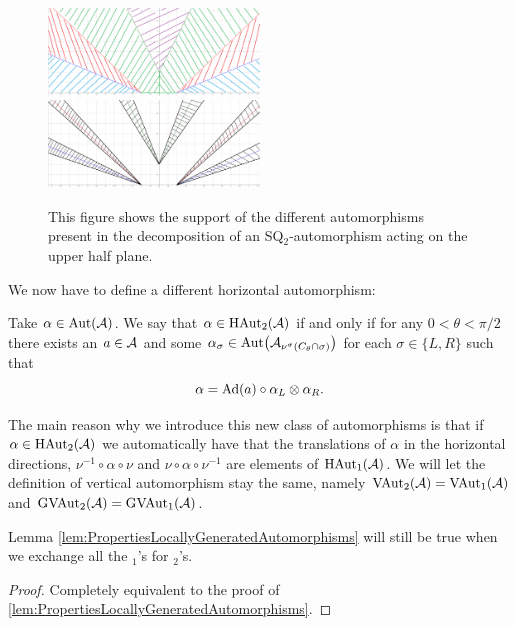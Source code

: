 \documentclass[12pt,a4paper,twoside]{article}
\numberwithin{equation}{section}
\begin{document}
\begin{figure}
	\includegraphics[width=0.5\textwidth]{Figures/AlphaFirstDecomposition2.png}
	\includegraphics[width=0.5\textwidth]{Figures/AlphaSecondDecomposition2.png}
	\caption{This figure shows the support of the different automorphisms present in the decomposition of an SQ$_2$-automorphism acting on the upper half plane.}
	\label{fig:SetupSQAut2}
\end{figure}
We now have to define a different horizontal automorphism:
\begin{definition}
	Take $\alpha\in\Aut{\AA}$. We say that $\alpha\in\textrm{HAut}_2(\AA)$ if and only if for any $0<\theta<\pi/2$ there exists an $a\in\AA$ and some $\alpha_\sigma\in\Aut{\AA_{\nu^{\sigma}(C_\theta\cap\sigma)}}$ for each $\sigma\in\{L,R\}$ such that
	\begin{equation}
		\alpha=\Ad{a}\circ\alpha_L\otimes\alpha_R.
	\end{equation}
\end{definition}
The main reason why we introduce this new class of automorphisms is that if $\alpha\in\textrm{HAut}_2(\AA)$ we automatically have that the translations of $\alpha$ in the horizontal directions, $\nu^{-1}\circ\alpha\circ\nu$ and $\nu\circ\alpha\circ\nu^{-1}$ are elements of $\textrm{HAut}_1(\AA)$. We will let the definition of vertical automorphism stay the same, namely $\textrm{VAut}_2(\AA)=\textrm{VAut}_1(\AA)$ and $\textrm{GVAut}_2(\AA)=\textrm{GVAut}_1(\AA)$.
\begin{lemma}\label{lem:PropertiesLocallyGeneratedAutomorphismsTwoTranslations}
	Lemma \ref{lem:PropertiesLocallyGeneratedAutomorphisms} will still be true when we exchange all the $_1$'s for $_2$'s.
\end{lemma}
\begin{proof}
	Completely equivalent to the proof of \ref{lem:PropertiesLocallyGeneratedAutomorphisms}.
\end{proof}
\end{document}
